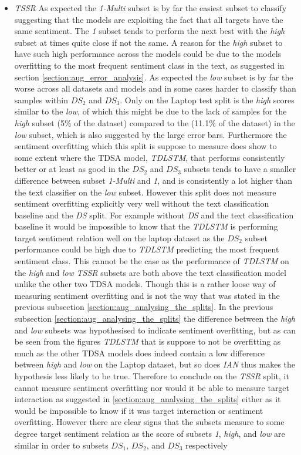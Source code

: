 \begin{itemize}
    \item \textit{TSSR} As expected the \textit{1-Multi} subset is by far the easiest subset to classify suggesting that the models are exploiting the fact that all targets have the same sentiment. The \textit{1} subset tends to perform the next best with the \textit{high} subset at times quite close if not the same. A reason for the \textit{high} subset to have such high performance across the models could be due to the models overfitting to the most frequent sentiment class in the text, as suggested in section \ref{section:aug_error_analysis}. As expected the \textit{low} subset is by far the worse across all datasets and models and in some cases harder to classify than samples within $DS_2$ and $DS_3$. Only on the Laptop test split is the \textit{high} scores similar to the \textit{low}, of which this might be due to the lack of samples for the \textit{high} subset (5\% of the dataset) compared to the (11.1\% of the dataset) in the \textit{low} subset, which is also suggested by the large error bars. Furthermore the sentiment overfitting which this split is suppose to measure does show to some extent where the TDSA model, \textit{TDLSTM}, that performs consistently better or at least as good in the $DS_2$ and $DS_3$ subsets tends to have a smaller difference between subset \textit{1-Multi} and \textit{1}, and is consistently a lot higher than the text classifier on the \textit{low} subset. However this split does not measure sentiment overfitting explicitly very well without the text classification baseline and the \textit{DS} split. For example without \textit{DS} and the text classification baseline it would be impossible to know that the \textit{TDLSTM} is performing target sentiment relation well on the laptop dataset as the $DS_2$ subset performance could be high due to \textit{TDLSTM} predicting the most frequent sentiment class. This cannot be the case as the performance of \textit{TDLSTM} on the \textit{high} and \textit{low} \textit{TSSR} subsets are both above the text classification model unlike the other two TDSA models. Though this is a rather loose way of measuring sentiment overfitting and is not the way that was stated in the previous subsection \ref{section:aug_analysing_the_splits}. In the previous  subsection \ref{section:aug_analysing_the_splits} the difference between the \textit{high} and \textit{low} subsets was hypothesised to indicate sentiment overfitting, but as can be seen from the figures \textit{TDLSTM} that is suppose to not be overfitting as much as the other TDSA models does indeed contain a low difference between \textit{high} and \textit{low} on the Laptop dataset, but so does \textit{IAN} thus makes the hypothesis less likely to be true. Therefore to conclude on the \textit{TSSR} split, it cannot measure sentiment overfitting nor would it be able to measure target interaction as suggested in \ref{section:aug_analysing_the_splits} either as it would be impossible to know if it was target interaction or sentiment overfitting. However there are clear signs that the subsets measure to some degree target sentiment relation as the score of subsets \textit{1}, \textit{high}, and \textit{low} are similar in order to subsets $DS_1$, $DS_2$, and $DS_3$ respectively 
\end{itemize}

